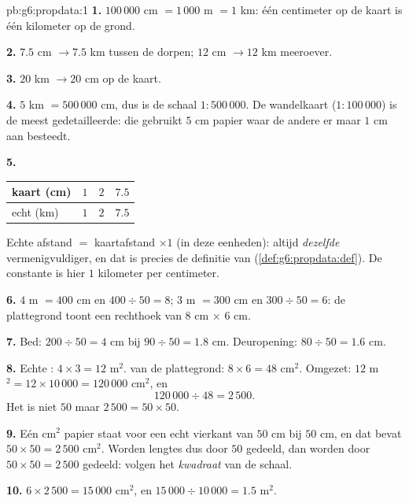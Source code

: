 \begin{solution}{pb:g6:propdata:1}
\textbf{1.} $100\,000$ cm $= 1\,000$ m $= 1$ km: één centimeter op de kaart is
één kilometer op de grond.

\textbf{2.} $7.5$ cm $\rightarrow 7.5$ km tussen de dorpen; $12$ cm
$\rightarrow 12$ km meeroever.

\textbf{3.} $20$ km $\rightarrow 20$ cm op de kaart.

\textbf{4.} $5$ km $= 500\,000$ cm, dus is de schaal $1:500\,000$. De wandelkaart
($1:100\,000$) is de meest gedetailleerde: die gebruikt $5$ cm papier waar de
andere er maar $1$ cm aan besteedt.

\textbf{5.}
\begin{center}
\renewcommand{\arraystretch}{1.2}
\begin{tabular}{l|ccc}
kaart (cm) & $1$ & $2$ & $7.5$ \\
\hline
echt (km) & $1$ & $2$ & $7.5$ \\
\end{tabular}
\end{center}
Echte afstand $=$ kaartafstand $\times 1$ (in deze eenheden): altijd
\emph{dezelfde} vermenigvuldiger, en dat is precies de definitie van
 (\cref{def:g6:propdata:def}). De constante is hier $1$ kilometer
per centimeter.

\textbf{6.} $4$ m $= 400$ cm en $400 \div 50 = 8$; $3$ m $= 300$ cm en
$300 \div 50 = 6$: de plattegrond toont een rechthoek van $8$ cm $\times$ $6$
cm.

\textbf{7.} Bed: $200 \div 50 = 4$ cm bij $90 \div 50 = 1.8$ cm. Deuropening:
$80 \div 50 = 1.6$ cm.

\textbf{8.} Echte : $4 \times 3 = 12$ m$^2$.  van de
plattegrond: $8 \times 6 = 48$ cm$^2$. Omgezet:
$12$ m$^2 = 12 \times 10\,000 = 120\,000$ cm$^2$, en
\[
120\,000 \div 48 = 2\,500 .
\]
Het  is niet $50$ maar $2\,500 = 50 \times 50$.

\textbf{9.} Eén cm$^2$ papier staat voor een echt vierkant van $50$ cm bij $50$
cm, en dat bevat $50 \times 50 = 2\,500$ cm$^2$. Worden lengtes dus door $50$
gedeeld, dan worden  door $50 \times 50 = 2\,500$ gedeeld:
 volgen het \emph{kwadraat} van de schaal.

\textbf{10.} $6 \times 2\,500 = 15\,000$ cm$^2$, en
$15\,000 \div 10\,000 = 1.5$ m$^2$.


\end{solution}
